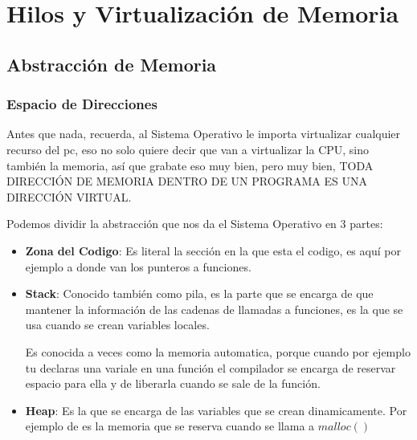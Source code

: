 \documentclass[12pt, fleqn]{report}                             %
\begin{document}
\part{Hilos y Virtualización de Memoria}
\clearpage


    \chapter{Abstracción de Memoria}

        \clearpage
        \section{Espacio de Direcciones}

            Antes que nada, recuerda, al Sistema Operativo le importa virtualizar cualquier recurso del pc,
            eso no solo quiere decir que van a virtualizar la CPU, sino también la memoria, así que grabate eso
            muy bien, pero muy bien, TODA DIRECCIÓN DE MEMORIA DENTRO DE UN PROGRAMA ES UNA DIRECCIÓN VIRTUAL.

            Podemos dividir la abstracción que nos da el Sistema Operativo en 3 partes:

            \begin{itemize}
                \item \textbf{Zona del Codigo}: Es literal la sección en la que esta el codigo, es aquí por
                ejemplo a donde van los punteros a funciones.

                \item \textbf{Stack}: Conocido también como pila, es la parte que se encarga de que mantener
                la información de las cadenas de llamadas a funciones, es la que se usa cuando se crean variables
                locales.

                Es conocida a veces como la memoria automatica, porque cuando por ejemplo tu declaras
                una variale en una función el compilador se encarga de reservar espacio para ella y de
                liberarla cuando se sale de la función.

                \item \textbf{Heap}: Es la que se encarga de las variables que se crean dinamicamente.
                Por ejemplo de es la memoria que se reserva cuando se llama a $malloc()$

            \end{itemize}
\end{document}
